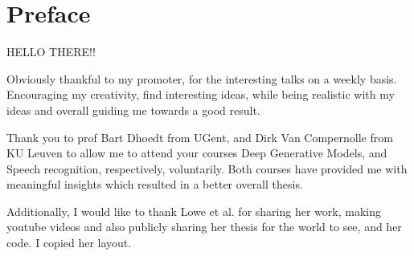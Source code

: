 \chapter*{Preface}
HELLO THERE!!

Obviously thankful to my promoter, for the interesting talks on a weekly basis.
Encouraging my creativity, find interesting ideas, while being realistic with my ideas and overall guiding me towards a good result.


Thank you to prof Bart Dhoedt from UGent, and Dirk Van Compernolle   from KU Leuven to allow me to attend your courses Deep Generative Models, and Speech recognition, respectively, voluntarily. Both courses have provided me with meaningful insights which resulted in a better overall thesis.

Additionally, I would like to thank Lowe et al. for sharing her work, making youtube videos and also publicly sharing her thesis for the world to see, and her code. I copied her layout.